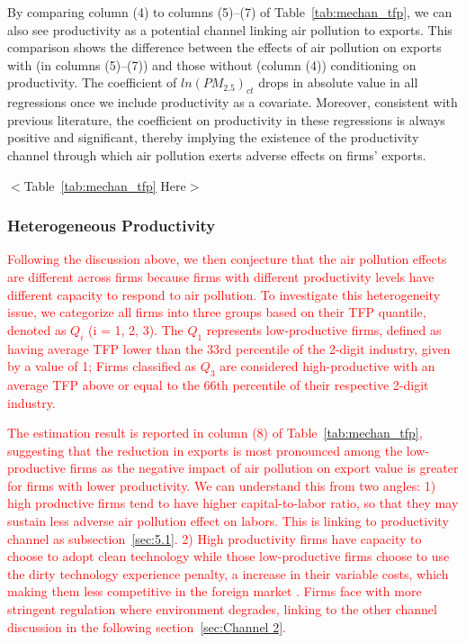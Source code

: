 \documentclass[12pt]{article}
\begin{document}
By comparing column (4) to columns (5)--(7) of Table~\ref{tab:mechan_tfp},
we can also see productivity as a potential channel linking air pollution to
exports. This comparison shows the difference between the effects of air
pollution on exports with (in columns (5)--(7)) and those without (column
(4)) conditioning on productivity. The coefficient of $ln(PM_{2.5})_{ct}$ drops
in absolute value in all regressions once we include productivity as a
covariate. Moreover, consistent with previous literature, the coefficient on productivity in these regressions is always positive and significant, thereby implying the existence of the productivity channel
through which air pollution exerts adverse effects on firms' exports. 

\begin{center}
$<$Table~\ref{tab:mechan_tfp} Here$>$
\end{center}

\subsubsection{Heterogeneous Productivity}

\textcolor{red}{Following the discussion above, we then conjecture that the air pollution effects are different across firms because firms with different
productivity levels have different capacity to respond to air pollution. To investigate this heterogeneity issue, we categorize all firms into three groups based on their TFP quantile, denoted as $Q_{i}$ (i = 1, 2, 3). The $Q_{1}$ represents low-productive firms, defined as having average TFP lower than the 33rd percentile of the 2-digit industry, given by a value of 1; Firms classified as $Q_{3}$ are considered high-productive with an average TFP above or equal to the 66th percentile of their respective 2-digit industry. }

\textcolor{red}{The estimation result is reported in column (8) of Table~\ref{tab:mechan_tfp}, suggesting that the reduction in exports is most pronounced among the low-productive firms as the negative impact of air pollution on export value is greater for firms with lower productivity. We can understand this from two angles: 1) high productive firms tend to have higher capital-to-labor ratio, so that they may sustain less adverse air pollution effect on labors. This is linking to productivity channel as subsection~\ref{sec:5.1}. 2) High productivity firms have capacity to choose to adopt clean technology while those low-productive firms choose to use the dirty technology experience penalty, a increase in their variable costs, which making them less competitive in the foreign market \citep{cherniwchan2022environmental}. Firms face with more stringent regulation where environment degrades, linking to the other channel discussion in the following section~\ref{sec:Channel 2}.}
\end{document}
